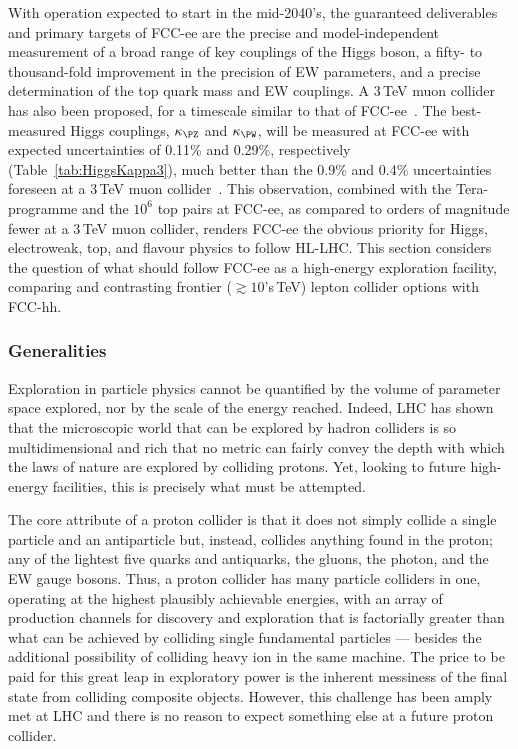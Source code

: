 With operation expected to start in the mid-2040's, 
the guaranteed deliverables and primary targets of FCC-ee are 
the precise and model-independent measurement of a broad range of key couplings of the Higgs boson, 
a fifty- to thousand-fold improvement in the precision of EW parameters, 
and a precise determination of the top quark mass and EW couplings.  
A 3\,TeV muon collider has also been proposed, for a timescale similar to that of FCC-ee~\cite{Black:2022cth}.
The best-measured Higgs couplings, $\kappa_{\PZ}$ and $\kappa_{\PW}$, 
will be measured at FCC-ee with expected uncertainties of 0.11\% and 0.29\%, respectively (Table~\ref{tab:HiggsKappa3}),  
much better than the 0.9\% and 0.4\% uncertainties foreseen at a 3\,TeV muon collider~\cite{MuonCollider:2022xlm}.  
This observation, combined with the \mbox{Tera-\PZ} programme and the $10^6$ top pairs at FCC-ee, 
as compared to orders of magnitude fewer at a 3\,TeV muon collider, 
renders FCC-ee the obvious priority for Higgs, electroweak, top, and flavour physics to follow HL-LHC.  
This section considers the question of what should follow FCC-ee as a high-energy exploration facility, 
comparing and contrasting frontier ($\gtrsim 10$'s\,TeV) lepton collider options with FCC-hh.

\subsubsection{Generalities}

Exploration in particle physics cannot be quantified by the volume of parameter space explored, nor by the scale of the energy reached.  
Indeed, LHC has shown that the microscopic world that can be explored by hadron colliders 
is so multidimensional and rich that no metric can fairly convey the depth 
with which the laws of nature are explored by colliding protons.  
Yet, looking to future high-energy facilities, this is precisely what must be attempted.

The core attribute of a proton collider is that it does not simply collide a single particle and an antiparticle but, instead, 
collides anything found in the proton; 
any of the lightest five quarks and antiquarks, the gluons, the photon, and the EW gauge bosons. 
Thus, a proton collider has many particle colliders in one, operating at the highest plausibly achievable energies, 
with an array of production channels for discovery and exploration that is factorially greater 
than what can be achieved by colliding single fundamental particles 
--- besides the additional possibility of colliding heavy ion in the same machine.  
The price to be paid for this great leap in exploratory power is the inherent messiness of the final state from colliding composite objects.  
However, this challenge has been amply met at LHC and there is no reason to expect something else at a future proton collider.

